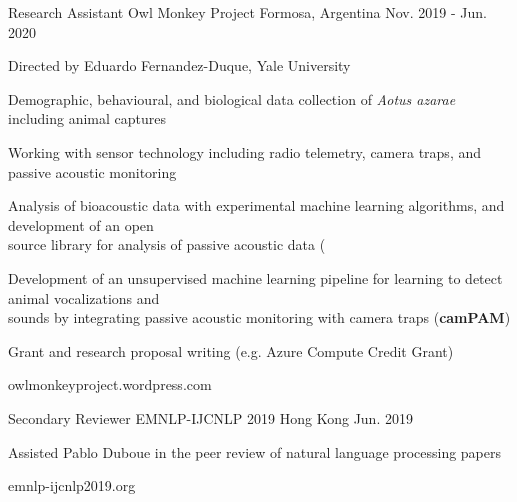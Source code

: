 

\begin{cventries}

  \cventry
    {Research Assistant} %
    {Owl Monkey Project} %
    {Formosa, Argentina} %
    {Nov. 2019 - Jun. 2020} %
    {
      \begin{cvitems} %
        \item {Directed by Eduardo Fernandez-Duque, Yale University}
        \item{Demographic, behavioural, and biological data collection of \textit{Aotus azarae} including animal captures}
        \item{Working with sensor technology including radio telemetry, camera traps, and passive acoustic monitoring}
        \item{Analysis of bioacoustic data with experimental machine learning algorithms, and development of an open \\ source library for analysis of passive acoustic data (}
        \item{Development of an unsupervised machine learning pipeline for learning to detect animal vocalizations and \\ sounds by integrating passive acoustic monitoring with camera traps (\textbf{camPAM})}
        \item{Grant and research proposal writing (e.g. Azure Compute Credit Grant)}
      \end{cvitems}
    }
    {owlmonkeyproject.wordpress.com}

  \cventry
    {Secondary Reviewer} %
    {EMNLP-IJCNLP 2019} %
    {Hong Kong} %
    {Jun. 2019} %
    {
      \begin{cvitems} %
        \item {Assisted Pablo Duboue in the peer review of natural language processing papers}
      \end{cvitems}
    }
    {emnlp-ijcnlp2019.org}


\end{cventries}
